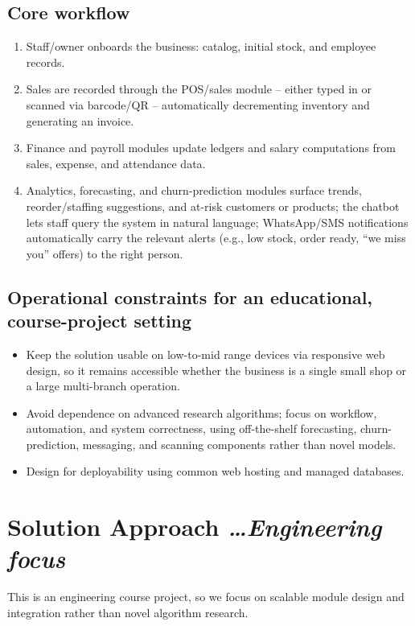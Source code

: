 \documentclass[11pt,a4paper]{article}
\newcommand{\BvrHint}[1]{%
  {\normalfont\normalsize\itshape\hfill #1}}
\begin{document}
\subsection{Core workflow}
\begin{enumerate}[leftmargin=0.7cm]
    \item Staff/owner onboards the business: catalog, initial stock, and employee records.
    \item Sales are recorded through the POS/sales module -- either typed in or scanned via barcode/QR -- automatically decrementing inventory and generating an invoice.
    \item Finance and payroll modules update ledgers and salary computations from sales, expense, and attendance data.
    \item Analytics, forecasting, and churn-prediction modules surface trends, reorder/staffing suggestions, and at-risk customers or products; the chatbot lets staff query the system in natural language; WhatsApp/SMS notifications automatically carry the relevant alerts (e.g., low stock, order ready, ``we miss you'' offers) to the right person.
\end{enumerate}

\subsection{Operational constraints for an educational, course-project setting}
\begin{itemize}[leftmargin=0.7cm]
    \item Keep the solution usable on low-to-mid range devices via responsive web design, so it remains accessible whether the business is a single small shop or a large multi-branch operation.
    \item Avoid dependence on advanced research algorithms; focus on workflow, automation, and system correctness, using off-the-shelf forecasting, churn-prediction, messaging, and scanning components rather than novel models.
    \item Design for deployability using common web hosting and managed databases.
\end{itemize}

\section{Solution Approach %
\BvrHint{\ldots Engineering focus}}
This is an engineering course project, so we focus on scalable module design and integration rather than novel algorithm research.
\end{document}
